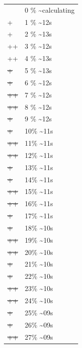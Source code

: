 \documentclass[12pt]{article}
\begin{document}
\begin{center}
\begin{tabular}{ll}
 & 0 \% \textasciitilde{}calculating\\
+ & 1 \% \textasciitilde{}12s\\
+ & 2 \% \textasciitilde{}13s\\
++ & 3 \% \textasciitilde{}12s\\
++ & 4 \% \textasciitilde{}13s\\
\sout{+} & 5 \% \textasciitilde{}13s\\
\sout{+} & 6 \% \textasciitilde{}12s\\
\sout{++} & 7 \% \textasciitilde{}12s\\
\sout{++} & 8 \% \textasciitilde{}12s\\
\sout{\sout{+}} & 9 \% \textasciitilde{}12s\\
\sout{\sout{+}} & 10\% \textasciitilde{}11s\\
\sout{\sout{++}} & 11\% \textasciitilde{}11s\\
\sout{\sout{++}} & 12\% \textasciitilde{}11s\\
\sout{\sout{\sout{+}}} & 13\% \textasciitilde{}11s\\
\sout{\sout{\sout{+}}} & 14\% \textasciitilde{}11s\\
\sout{\sout{\sout{++}}} & 15\% \textasciitilde{}11s\\
\sout{\sout{\sout{++}}} & 16\% \textasciitilde{}11s\\
\sout{\sout{\sout{\sout{+}}}} & 17\% \textasciitilde{}11s\\
\sout{\sout{\sout{\sout{+}}}} & 18\% \textasciitilde{}10s\\
\sout{\sout{\sout{\sout{++}}}} & 19\% \textasciitilde{}10s\\
\sout{\sout{\sout{\sout{++}}}} & 20\% \textasciitilde{}10s\\
\sout{\sout{\sout{\sout{\sout{+}}}}} & 21\% \textasciitilde{}10s\\
\sout{\sout{\sout{\sout{\sout{+}}}}} & 22\% \textasciitilde{}10s\\
\sout{\sout{\sout{\sout{\sout{++}}}}} & 23\% \textasciitilde{}10s\\
\sout{\sout{\sout{\sout{\sout{++}}}}} & 24\% \textasciitilde{}10s\\
\sout{\sout{\sout{\sout{\sout{\sout{+}}}}}} & 25\% \textasciitilde{}09s\\
\sout{\sout{\sout{\sout{\sout{\sout{+}}}}}} & 26\% \textasciitilde{}09s\\
\sout{\sout{\sout{\sout{\sout{\sout{++}}}}}} & 27\% \textasciitilde{}09s\\

\end{tabular}
\end{center}
\end{document}
